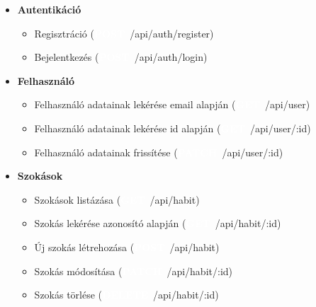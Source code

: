 \documentclass[12pt]{report}
\newcommand{\httpGet}[1]{\colorbox{getColor}{\textbf{\textcolor{white}{GET}}}~#1}
\newcommand{\httpPost}[1]{\colorbox{postColor}{\textbf{\textcolor{white}{POST}}}~#1}
\newcommand{\httpPatch}[1]{\colorbox{patchColor}{\textbf{\textcolor{white}{PATCH}}}~#1}
\newcommand{\httpDelete}[1]{\colorbox{deleteColor}{\textbf{\textcolor{white}{DELETE}}}~#1}
\begin{document}
\begin{itemize}
  \item \textbf{Autentikáció}
    \begin{itemize}
      \item Regisztráció (\httpPost{/api/auth/register})
      \item Bejelentkezés (\httpPost{/api/auth/login})
    \end{itemize}
  \item \textbf{Felhasználó}
    \begin{itemize}
      \item Felhasználó adatainak lekérése email alapján (\httpGet{/api/user})
      \item Felhasználó adatainak lekérése id alapján (\httpGet{/api/user/:id})
      \item Felhasználó adatainak frissítése (\httpPatch{/api/user/:id})
    \end{itemize}
  \item \textbf{Szokások}
    \begin{itemize}
      \item Szokások listázása (\httpGet{/api/habit})

      \item Szokás lekérése azonosító alapján (\httpGet{/api/habit/:id})
      \item Új szokás létrehozása (\httpPost{/api/habit})
      \item Szokás módosítása (\httpPatch{/api/habit/:id})
      \item Szokás törlése (\httpDelete{/api/habit/:id})
      

\end{itemize}
\end{itemize}
\end{document}
